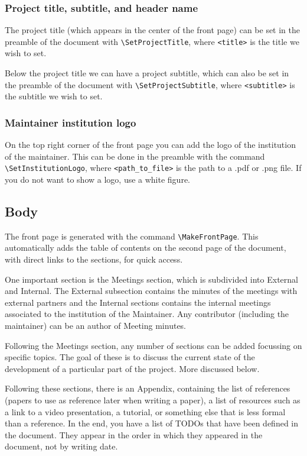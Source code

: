 \documentclass{project-logbook}
\begin{document}
		\subsubsection{Project title, subtitle, and header name}
			The project title (which appears in the center of the front page) can be set in the preamble of the document with \texttt{\textbackslash SetProjectTitle}, where \texttt{<title>} is the title we wish to set.

			Below the project title we can have a project subtitle, which can also be set in the preamble of the document with \texttt{\textbackslash SetProjectSubtitle}, where \texttt{<subtitle>} is the subtitle we wish to set.

		\subsubsection{Maintainer institution logo}
			On the top right corner of the front page you can add the logo of the institution of the maintainer. This can be done in the preamble with the command \texttt{\textbackslash SetInstitutionLogo}, where \texttt{<path\_to\_file>} is the path to a .pdf or .png file. If you do not want to show a logo, use a white figure.

	\subsection{Body}
		The front page is generated with the command \texttt{\textbackslash MakeFrontPage}. This automatically adds the table of contents on the second page of the document, with direct links to the sections, for quick access.

		One important section is the Meetings section, which is subdivided into External and Internal. The External subsection contains the minutes of the meetings with external partners and the Internal sections contains the internal meetings associated to the institution of the Maintainer. Any contributor (including the maintainer) can be an author of Meeting minutes.

		Following the Meetings section, any number of sections can be added focussing on specific topics. The goal of these is to discuss the current state of the development of a particular part of the project. More discussed below.

		Following these sections, there is an Appendix, containing the list of references (papers to use as reference later when writing a paper), a list of resources such as a link to a video presentation, a tutorial, or something else that is less formal than a reference. In the end, you have a list of TODOs that have been defined in the document. They appear in the order in which they appeared in the document, not by writing date.
\end{document}
